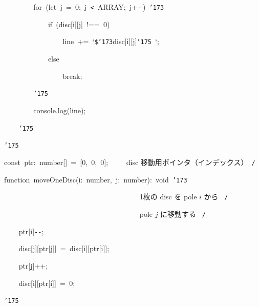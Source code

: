 \documentclass{article}
\begin{document}
\noindent
\mbox{}{\tt\mc \ \ \ \ \ \ \ \ }for{\tt\mc \ }(let{\tt\mc \ }j{\tt\mc \ }={\tt\mc \ }0;{\tt\mc \ }j{\tt\mc \ }{\tt <}{\tt\mc \ }ARRAY;{\tt\mc \ }j++){\tt\mc \ }{\tt\char'173}

\noindent
\mbox{}{\tt\mc \ \ \ \ \ \ \ \ \ \ \ \ }if{\tt\mc \ }(disc[i][j]{\tt\mc \ }!=={\tt\mc \ }0)

\noindent
\mbox{}{\tt\mc \ \ \ \ \ \ \ \ \ \ \ \ \ \ \ \ }line{\tt\mc \ }+={\tt\mc \ }`{\tt\$}{\tt\char'173}disc[i][j]{\tt\char'175}{\tt\mc \ }`;

\noindent
\mbox{}{\tt\mc \ \ \ \ \ \ \ \ \ \ \ \ }else

\noindent
\mbox{}{\tt\mc \ \ \ \ \ \ \ \ \ \ \ \ \ \ \ \ }break;

\noindent
\mbox{}{\tt\mc \ \ \ \ \ \ \ \ }{\tt\char'175}

\noindent
\mbox{}{\tt\mc \ \ \ \ \ \ \ \ }console.log(line);

\noindent
\mbox{}{\tt\mc \ \ \ \ }{\tt\char'175}

\noindent
\mbox{}{\tt\char'175}

\noindent
\mbox{}\hfill

\noindent
\mbox{}const{\tt\mc \ }ptr:{\tt\mc \ }number[]{\tt\mc \ }={\tt\mc \ }[0,{\tt\mc \ }0,{\tt\mc \ }0];{\tt\mc \ \ \ \ }\rm\mc {\tt /}{\tt *}\  {}disc 移動用ポインタ（インデックス）\hfill \rm\mc \ {\tt *}{\tt /}
\tt\mc 

\noindent
\mbox{}\hfill

\noindent
\mbox{}function{\tt\mc \ }moveOneDisc(i:{\tt\mc \ }number,{\tt\mc \ }j:{\tt\mc \ }number):{\tt\mc \ }void{\tt\mc \ }{\tt\char'173}

\noindent
\mbox{}{\tt\mc \ \ \ \ \ \ \ \ \ \ \ \ \ \ \ \ \ \ \ \ \ \ \ \ \ \ \ \ \ \ \ \ \ \ \ \ }\rm\mc {\tt /}{\tt *}\  {}1枚の disc を pole $i$ から \hfill \rm\mc \ {\tt *}{\tt /}
\tt\mc 

\noindent
\mbox{}{\tt\mc \ \ \ \ \ \ \ \ \ \ \ \ \ \ \ \ \ \ \ \ \ \ \ \ \ \ \ \ \ \ \ \ \ \ \ \ }\rm\mc {\tt /}{\tt *}\  {}pole $j$ に移動する \hfill \rm\mc \ {\tt *}{\tt /}
\tt\mc 

\noindent
\mbox{}{\tt\mc \ \ \ \ }ptr[i]{\tt -}{\tt -};

\noindent
\mbox{}{\tt\mc \ \ \ \ }disc[j][ptr[j]]{\tt\mc \ }={\tt\mc \ }disc[i][ptr[i]];

\noindent
\mbox{}{\tt\mc \ \ \ \ }ptr[j]++;

\noindent
\mbox{}{\tt\mc \ \ \ \ }disc[i][ptr[i]]{\tt\mc \ }={\tt\mc \ }0;

\noindent
\mbox{}{\tt\char'175}
\end{document}
